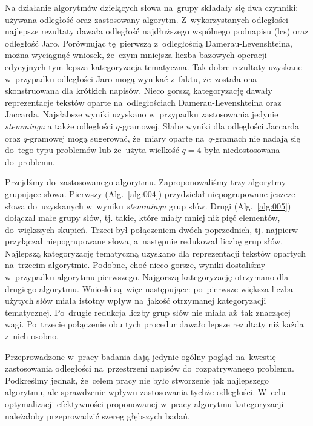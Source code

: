 \documentclass{praca1}
\begin{document}
Na działanie algorytmów dzielących słowa na~grupy składały się dwa czynniki: używana odległość oraz zastosowany algorytm. Z~wykorzystanych odległości najlepsze rezultaty dawała odległość najdłuższego wspólnego podnapisu (lcs) oraz odległość Jaro. Porównując tę~pierwszą z~odległością Damerau-Levenshteina, można wyciągnąć wniosek, że~czym mniejsza liczba bazowych operacji edycyjnych tym lepsza kategoryzacja tematyczna. Tak dobre rezultaty uzyskane w~przypadku odległości Jaro mogą wynikać z~faktu, że~została ona skonstruowana dla krótkich napisów. Nieco gorszą kategoryzację dawały reprezentacje tekstów oparte na~odległościach Damerau-Levenshteina oraz Jaccarda. Najsłabsze wyniki uzyskano w~przypadku zastosowania jedynie \emph{stemmingu} a także odległości $q$-gramowej. Słabe wyniki dla odległości Jaccarda oraz $q$-gramowej mogą sugerować, że~miary oparte na~$q$-gramach nie nadają się do~tego typu problemów lub że~użyta wielkość $q=4$ była niedostosowana do~problemu.

Przejdźmy do~zastosowanego algorytmu. Zaproponowaliśmy trzy algorytmy grupujące słowa. Pierwszy (Alg.~\ref{alg:004}) przydzielał niepogrupowane jeszcze słowa do~uzyskanych w~wyniku \emph{stemmingu} grup słów. Drugi (Alg.~\ref{alg:005}) dołączał małe grupy słów, tj. takie, które miały mniej niż pięć elementów, do~większych skupień. Trzeci był połączeniem dwóch poprzednich, tj. najpierw przyłączał niepogrupowane słowa, a~następnie redukował liczbę grup słów. Najlepszą kategoryzację tematyczną uzyskano dla reprezentacji tekstów opartych na~trzecim algorytmie. Podobne, choć nieco gorsze, wyniki dostaliśmy w~przypadku algorytmu pierwszego. Najgorszą kategoryzację otrzymano dla drugiego algorytmu. Wnioski są~więc następujące: po~pierwsze większa liczba użytych słów miała istotny wpływ na~jakość otrzymanej kategoryzacji tematycznej. Po~drugie redukcja liczby grup słów nie miała aż~tak znaczącej wagi. Po~trzecie połączenie obu tych procedur dawało lepsze rezultaty niż każda z~nich osobno.

Przeprowadzone w~pracy badania dają jedynie ogólny pogląd na~kwestię zastosowania odległości na~przestrzeni napisów do~rozpatrywanego problemu. Podkreślmy jednak, że~celem pracy nie było stworzenie jak najlepszego algorytmu, ale sprawdzenie wpływu zastosowania tychże odległości. W~celu optymalizacji efektywności proponowanej w~pracy algorytmu kategoryzacji należałoby przeprowadzić szereg głębszych badań.
\end{document}
